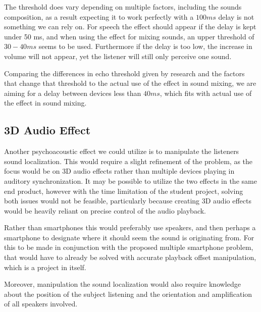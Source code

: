 The threshold does vary depending on multiple factors, including the sounds composition, as a result expecting it to work perfectly with a $100 ms$ delay is not something we can rely on.
For speech the effect should appear if the delay is kept under 50 ms, and when using the effect for mixing sounds, an upper threshold of $30 - 40 ms$ seems to be used.
Furthermore if the delay is too low, the increase in volume will not appear, yet the listener will still only perceive one sound.\cite{useprecedence1, useprecedence2, useprecedence3}

Comparing the differences in echo threshold given by research and the factors that change that threshold to the actual use of the effect in sound mixing, we are aiming for a delay between devices less than $40 ms$, which fits with actual use of the effect in sound mixing.

\subsection{3D Audio Effect}
Another psychoacoustic effect we could utilize is to manipulate the listeners sound localization.
This would require a slight refinement of the problem, as the focus would be on 3D audio effects rather than multiple devices playing in auditory synchronization.
It may be possible to utilize the two effects in the same end product, however with the time limitation of the student project, solving both issues would not be feasible, particularly because creating 3D audio effects would be heavily reliant on precise control of the audio playback.

Rather than smartphones this would preferably use speakers, and then perhaps a smartphone to designate where it should seem the sound is originating from.
For this to be made in conjunction with the proposed multiple smartphone problem, that would have to already be solved with accurate playback offset manipulation, which is a project in itself.

Moreover, manipulation the sound localization would also require knowledge about the position of the subject listening and the orientation and amplification of all speakers involved.

